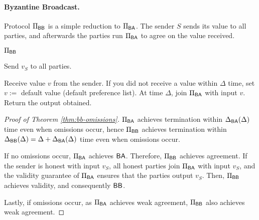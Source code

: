 \paragraph{Byzantine Broadcast.}
Protocol $\Pi_{\textsf{BB}}$ is a simple reduction to $\Pi_{\textsf{BA}}$. The sender $S$ sends its value to all parties, and afterwards the parties run $\Pi_{\textsf{BA}}$ to agree on the value received.
\begin{protocolbox}{$\Pi_{\textsf{BB}}$}
    \begin{algorithmic}[1]
    \State Send $v_{S}$ to all parties.
    \end{algorithmic}

    \begin{algorithmic}[1]
    \State Receive value $v$ from the sender. If you did not receive a value within $\Delta$ time, set $v :=$ default value (default preference list).
    \State At time $\Delta$, join $\Pi_{\textsf{BA}}$ with input $v$. Return the output obtained.
\end{algorithmic}
\end{protocolbox}

\begin{proof}[Proof of Theorem \ref{thm:bb-omissions}]
$\Pi_{\textsf{BA}}$ achieves termination within $\Delta_{\textsf{BA}}(\Delta)$ time even when omissions occur, hence $\Pi_{\textsf{BB}}$ achieves termination within $\Delta_{\textsf{BB}}(\Delta) = \Delta + \Delta_{\textsf{BA}}(\Delta)$ time even when omissions occur.

If no omissions occur, $\Pi_{\textsf{BA}}$ achieves $\textsf{BA}$. Therefore, $\Pi_{\textsf{BB}}$ achieves agreement. If the sender is honest with input $v_S$, all honest parties join $\Pi_{\textsf{BA}}$ with input $v_S$, and the validity guarantee of $\Pi_{\textsf{BA}}$ ensures that the parties output $v_S$. Then, $\Pi_{\textsf{BB}}$ achieves validity, and consequently $\textsf{BB}$.

Lastly, if omissions occur, as $\Pi_{\textsf{BA}}$ achieves weak agreement, $\Pi_{\textsf{BB}}$ also achieves weak agreement.
\end{proof}


